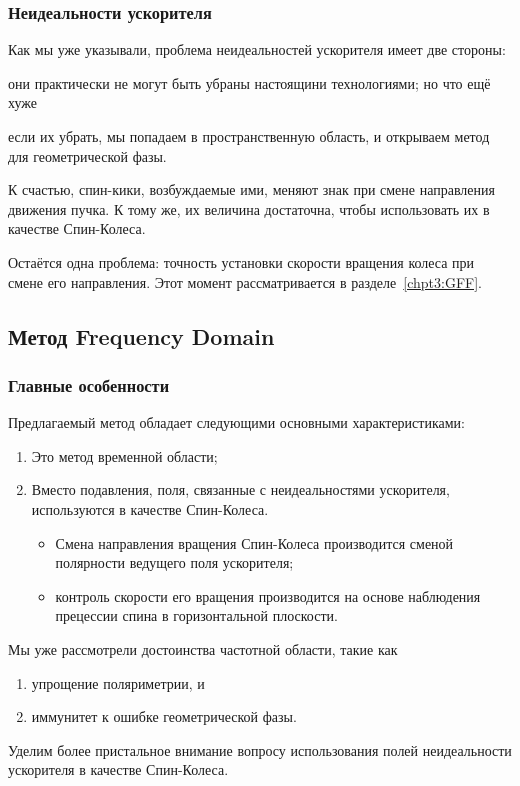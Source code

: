\subsubsection{Неидеальности ускорителя}
Как мы уже указывали, проблема неидеальностей ускорителя имеет две стороны:
\begin{enumerate*}
	\item они практически не могут быть убраны настоящини технологиями; но что ещё хуже
	\item если их убрать, мы попадаем в пространственную область, и открываем метод для геометрической фазы.
\end{enumerate*}

К счастью, спин-кики, возбуждаемые ими, меняют знак при смене направления движения пучка. К тому же,
их величина достаточна, чтобы использовать их в качестве Спин-Колеса. 

Остаётся одна проблема: точность установки скорости вращения колеса при смене его направления. Этот момент
рассматривается в разделе~\ref{chpt3:GFF}.

\subsection{Метод Frequency Domain}\label{sec:FDM_concept}
\subsubsection{Главные особенности}
Предлагаемый метод обладает следующими основными характеристиками:
\begin{enumerate}
	\item Это метод временной области;
	\item Вместо подавления, поля, связанные с неидеальностями ускорителя, используются в качестве Спин-Колеса.
	\begin{itemize}
		\item Смена направления вращения Спин-Колеса производится сменой полярности ведущего поля ускорителя;
		\item контроль скорости его вращения производится на основе наблюдения прецессии спина в горизонтальной плоскости.
	\end{itemize}
\end{enumerate}

Мы уже рассмотрели достоинства частотной области, такие как 
\begin{enumerate}
	\item упрощение поляриметрии, и 
	\item иммунитет к ошибке геометрической фазы.
\end{enumerate}
Уделим более пристальное внимание вопросу использования полей неидеальности ускорителя в качестве Спин-Колеса.

